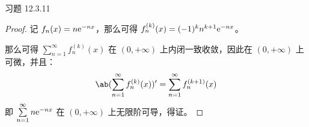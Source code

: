 \begin{problem}
    习题 12.3.11
    \begin{proof}
        记 $f_n(x) = n \mathrm{e}^{-n x}$，那么可得 $f_n^{(k)}(x) = (-1)^k n^{k + 1} \mathrm{e}^{-n x}$。

        那么可得 $\sum\limits_{n = 1}^{\infty} f_n^{(k)}(x)$ 在 $(0, +\infty)$ 上内闭一致收敛，因此在 $(0, +\infty)$ 上可微，并且：
        $$
        \ab(\sum_{n = 1}^{\infty} f_n^{(k)}(x))' = \sum_{n = 1}^{\infty} f_n^{(k + 1)}(x)
        $$
        即 $\sum\limits_{n = 1}^{\infty} n \mathrm{e}^{-n x}$ 在 $(0, + \infty)$ 上无限阶可导，得证。
    \end{proof}
\end{problem}
